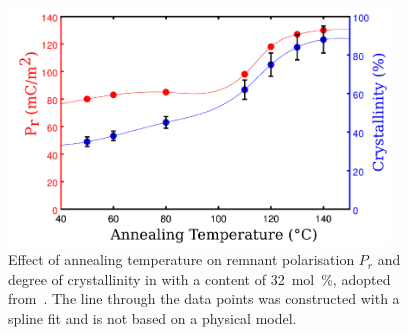 \begin{figure}
\centering
	\includegraphics[width=0.9\textwidth]{./figs/chap1/annealtemp}
	\caption{Effect of annealing temperature on remnant polarisation $P_r$ and degree of crystallinity in \pvfe{} with a \trfe{} content of \SI{32}{\mole\percent}, adopted from~\cite[p. 813]{encyclopedia}. The line through the data points was constructed with a spline fit and is not based on a physical model.}
	\label{fig:annealtemp}
\end{figure}
